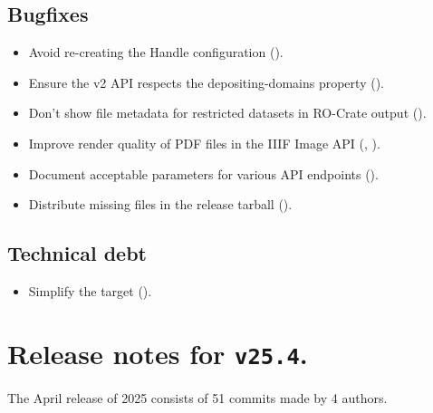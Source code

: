 \subsection*{Bugfixes}
\begin{itemize}
\item{Avoid re-creating the Handle configuration
    ().}
\item{Ensure the v2 API respects the depositing-domains property
    ().}
\item{Don't show file metadata for restricted datasets in RO-Crate
    output ().}
\item{Improve render quality of PDF files in the IIIF Image API
    (,
    ).}
\item{Document acceptable parameters for various API endpoints
    ().}
\item{Distribute missing files in the release tarball
    ().}
\end{itemize}

\subsection*{Technical debt}
\begin{itemize}
\item{Simplify the  target
    ().}
\end{itemize}

\section*{Release notes for \texttt{v25.4}.}

  The April release of 2025 consists of 51 commits made by 4 authors.


